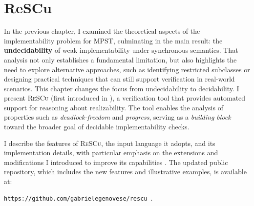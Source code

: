 \chapter{ReSCu}\label{sec:rescu}
In the previous chapter, I examined the theoretical aspects of the
implementability problem for MPST, culminating in the main result: the
\textbf{undecidability} of weak implementability under synchronous
semantics. That analysis not only establishes a fundamental limitation,
but also highlights the need to explore alternative approaches, such as
identifying restricted subclasses or designing practical techniques that
can still support verification in real-world scenarios.  
This chapter changes the focus from undecidability to decidability. I present
\textsc{ReSCu} (first introduced in
\cite{desgeorges2023rsc,di2023multiparty,guizouarn2023communicating}),
a verification tool that provides automated support for reasoning about
realizability. The tool enables the analysis of properties such as
\textit{deadlock-freedom} and \textit{progress}, serving as a
\emph{building block} toward the broader goal of decidable
implementability checks.  

I describe the features of \textsc{ReSCu}, the input language it adopts,
and its implementation details, with particular emphasis on the
extensions and modifications I introduced to improve its capabilities
\cite{rescuoriginalrepo}. The updated public repository, which includes
the new features and illustrative examples, is available at:
\begin{center}
\verb|https://github.com/gabrielegenovese/rescu|~\cite{rescurepo}.
\end{center}

